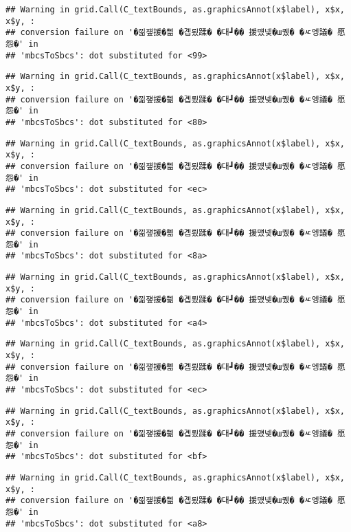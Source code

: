 \documentclass[
]{article}
\begin{document}
\begin{verbatim}
## Warning in grid.Call(C_textBounds, as.graphicsAnnot(x$label), x$x, x$y, :
## conversion failure on '�낆쟾援�쁾 �곕룄蹂� �대┛�� 援먰넻�ш퀬� �ㅼ엥議� 愿怨�' in
## 'mbcsToSbcs': dot substituted for <99>
\end{verbatim}

\begin{verbatim}
## Warning in grid.Call(C_textBounds, as.graphicsAnnot(x$label), x$x, x$y, :
## conversion failure on '�낆쟾援�쁾 �곕룄蹂� �대┛�� 援먰넻�ш퀬� �ㅼ엥議� 愿怨�' in
## 'mbcsToSbcs': dot substituted for <80>
\end{verbatim}

\begin{verbatim}
## Warning in grid.Call(C_textBounds, as.graphicsAnnot(x$label), x$x, x$y, :
## conversion failure on '�낆쟾援�쁾 �곕룄蹂� �대┛�� 援먰넻�ш퀬� �ㅼ엥議� 愿怨�' in
## 'mbcsToSbcs': dot substituted for <ec>
\end{verbatim}

\begin{verbatim}
## Warning in grid.Call(C_textBounds, as.graphicsAnnot(x$label), x$x, x$y, :
## conversion failure on '�낆쟾援�쁾 �곕룄蹂� �대┛�� 援먰넻�ш퀬� �ㅼ엥議� 愿怨�' in
## 'mbcsToSbcs': dot substituted for <8a>
\end{verbatim}

\begin{verbatim}
## Warning in grid.Call(C_textBounds, as.graphicsAnnot(x$label), x$x, x$y, :
## conversion failure on '�낆쟾援�쁾 �곕룄蹂� �대┛�� 援먰넻�ш퀬� �ㅼ엥議� 愿怨�' in
## 'mbcsToSbcs': dot substituted for <a4>
\end{verbatim}

\begin{verbatim}
## Warning in grid.Call(C_textBounds, as.graphicsAnnot(x$label), x$x, x$y, :
## conversion failure on '�낆쟾援�쁾 �곕룄蹂� �대┛�� 援먰넻�ш퀬� �ㅼ엥議� 愿怨�' in
## 'mbcsToSbcs': dot substituted for <ec>
\end{verbatim}

\begin{verbatim}
## Warning in grid.Call(C_textBounds, as.graphicsAnnot(x$label), x$x, x$y, :
## conversion failure on '�낆쟾援�쁾 �곕룄蹂� �대┛�� 援먰넻�ш퀬� �ㅼ엥議� 愿怨�' in
## 'mbcsToSbcs': dot substituted for <bf>
\end{verbatim}

\begin{verbatim}
## Warning in grid.Call(C_textBounds, as.graphicsAnnot(x$label), x$x, x$y, :
## conversion failure on '�낆쟾援�쁾 �곕룄蹂� �대┛�� 援먰넻�ш퀬� �ㅼ엥議� 愿怨�' in
## 'mbcsToSbcs': dot substituted for <a8>
\end{verbatim}
\end{document}

